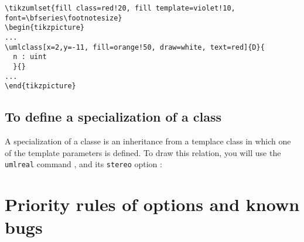 \documentclass[a4paper,11pt]{report}
\newcommand{\inputTikZ}[1]{%
  }%
\newcommand{\inputTikZ}[1]{%
    \texttt{[image: fig/\#1.pdf]}%
  }%
\begin{document}
\begin{lstlisting}
\tikzumlset{fill class=red!20, fill template=violet!10, font=\bfseries\footnotesize}
\begin{tikzpicture}
...
\umlclass[x=2,y=-11, fill=orange!50, draw=white, text=red]{D}{
  n : uint
  }{}
...
\end{tikzpicture}
\end{lstlisting}

\begin{center}
\inputTikZ{tikzumlset}
\end{center}

\subsection{To define a specialization of a class}

A specialization of a classe is an inheritance from a templace class in which one of the template parameters is defined. To draw this relation,  you will use the {\tt umlreal} command , and its {\tt stereo} option :

\medskip

\begin{minipage}{0.5\textwidth}

\end{minipage}
\begin{minipage}{0.5\textwidth}
\begin{center}
\inputTikZ{specialisation}
\end{center}
\end{minipage}

\section{Priority rules of options and known bugs}\label{s.classbug}
\end{document}
